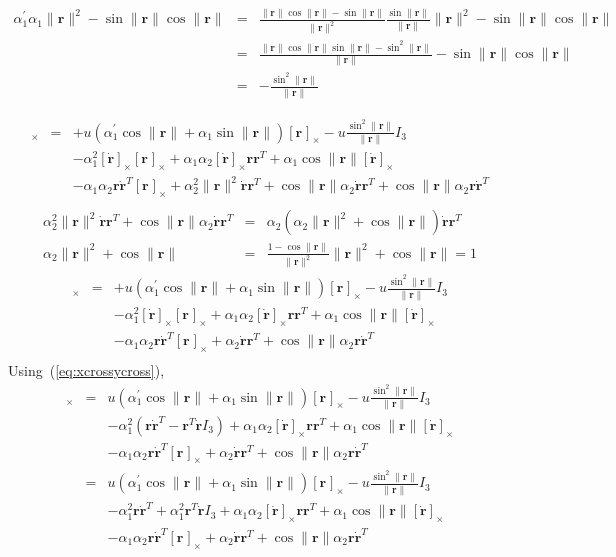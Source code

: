 \documentclass {article}
\newcommand\rot{\mathbf{r}}
\newcommand\rcross[1]{[\rot_{#1}]_{\times}}
\newcommand\omegacross{[\omega]_{\times}}
\newcommand\rdotcross{\left[\dot{\rot}\right]_{\times}}
\newcommand\normr{\|\rot\|}
\newcommand\alphap{\alpha^{\prime}}
\begin{document}
\begin{eqnarray*}
\alphap_1\alpha_1\normr^2 - \sin\normr\cos\normr &=&
\frac{\normr \cos \normr - \sin \normr}{\normr^2}\frac{\sin \normr}{\normr}\normr^2- \sin\normr\cos\normr\\
&=&
\frac{\normr\cos\normr\sin\normr - \sin^2\normr}{\normr}- \sin\normr\cos\normr\\&=&-\frac{\sin^2\normr}{\normr}
\end{eqnarray*}

\begin{eqnarray*}
\omegacross &=&
+ u\left(\alphap_1 \cos\normr + \alpha_1\sin\normr\right) \rcross{} -u \frac{\sin^2\normr}{\normr} I_3\\
&& -\alpha_1^2 \rdotcross\rcross{} + \alpha_1 \alpha_2 \rdotcross\rot\rot^T + \alpha_1\cos\normr\rdotcross\\
&&- \alpha_1 \alpha_2 \rot\dot{\rot}^T\rcross{} +  \alpha_2^2\normr^2\dot{\rot}\rot^T + \cos\normr\alpha_2\dot{\rot}\rot^T + \cos\normr\alpha_2\rot\dot{\rot}^T\\
\end{eqnarray*}
\begin{eqnarray*}
\alpha_2^2\normr^2\dot{\rot}\rot^T + \cos\normr\alpha_2\dot{\rot}\rot^T &=&
\alpha_2\left(\alpha_2\normr^2 + \cos\normr\right)\dot{\rot}\rot^T\\
\alpha_2\normr^2 + \cos\normr &=& \frac{1 - \cos \normr}{\normr^2}\normr^2 + \cos\normr = 1
\end{eqnarray*}
\begin{eqnarray*}
\omegacross &=&
+ u\left(\alphap_1 \cos\normr + \alpha_1\sin\normr\right) \rcross{} -u \frac{\sin^2\normr}{\normr} I_3\\
&& -\alpha_1^2 \rdotcross\rcross{} + \alpha_1 \alpha_2 \rdotcross\rot\rot^T + \alpha_1\cos\normr\rdotcross\\
&&- \alpha_1 \alpha_2 \rot\dot{\rot}^T\rcross{} + \alpha_2\dot{\rot}\rot^T + \cos\normr\alpha_2\rot\dot{\rot}^T\\
\end{eqnarray*}
Using~(\ref{eq:xcrossycross}),
\begin{eqnarray*}
\omegacross &=&
u\left(\alphap_1 \cos\normr + \alpha_1\sin\normr\right) \rcross{} -u \frac{\sin^2\normr}{\normr} I_3\\
&& -\alpha_1^2 (\rot\dot{\rot}^T-\rot^T\dot{\rot} I_3) + \alpha_1 \alpha_2 \rdotcross\rot\rot^T + \alpha_1\cos\normr\rdotcross\\
&&- \alpha_1 \alpha_2 \rot\dot{\rot}^T\rcross{} + \alpha_2\dot{\rot}\rot^T + \cos\normr\alpha_2\rot\dot{\rot}^T\\
&=& u\left(\alphap_1 \cos\normr + \alpha_1\sin\normr\right) \rcross{} -u \frac{\sin^2\normr}{\normr} I_3\\
&& -\alpha_1^2\rot\dot{\rot}^T+\alpha_1^2\rot^T\dot{\rot} I_3 + \alpha_1 \alpha_2 \rdotcross\rot\rot^T + \alpha_1\cos\normr\rdotcross\\
&&- \alpha_1 \alpha_2 \rot\dot{\rot}^T\rcross{} + \alpha_2\dot{\rot}\rot^T + \cos\normr\alpha_2\rot\dot{\rot}^T\\
\end{eqnarray*}
\end{document}
